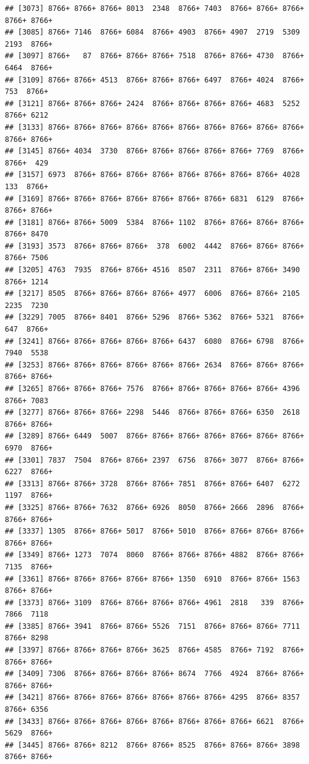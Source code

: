 \documentclass[
]{book}
\begin{document}
\begin{verbatim}
## [3073] 8766+ 8766+ 8766+ 8013  2348  8766+ 7403  8766+ 8766+ 8766+ 8766+ 8766+
## [3085] 8766+ 7146  8766+ 6084  8766+ 4903  8766+ 4907  2719  5309  2193  8766+
## [3097] 8766+   87  8766+ 8766+ 8766+ 7518  8766+ 8766+ 4730  8766+ 6464  8766+
## [3109] 8766+ 8766+ 4513  8766+ 8766+ 8766+ 6497  8766+ 4024  8766+  753  8766+
## [3121] 8766+ 8766+ 8766+ 2424  8766+ 8766+ 8766+ 8766+ 4683  5252  8766+ 6212 
## [3133] 8766+ 8766+ 8766+ 8766+ 8766+ 8766+ 8766+ 8766+ 8766+ 8766+ 8766+ 8766+
## [3145] 8766+ 4034  3730  8766+ 8766+ 8766+ 8766+ 8766+ 7769  8766+ 8766+  429 
## [3157] 6973  8766+ 8766+ 8766+ 8766+ 8766+ 8766+ 8766+ 8766+ 4028   133  8766+
## [3169] 8766+ 8766+ 8766+ 8766+ 8766+ 8766+ 8766+ 6831  6129  8766+ 8766+ 8766+
## [3181] 8766+ 8766+ 5009  5384  8766+ 1102  8766+ 8766+ 8766+ 8766+ 8766+ 8470 
## [3193] 3573  8766+ 8766+ 8766+  378  6002  4442  8766+ 8766+ 8766+ 8766+ 7506 
## [3205] 4763  7935  8766+ 8766+ 4516  8507  2311  8766+ 8766+ 3490  8766+ 1214 
## [3217] 8505  8766+ 8766+ 8766+ 8766+ 4977  6006  8766+ 8766+ 2105  2235  7230 
## [3229] 7005  8766+ 8401  8766+ 5296  8766+ 5362  8766+ 5321  8766+  647  8766+
## [3241] 8766+ 8766+ 8766+ 8766+ 8766+ 6437  6080  8766+ 6798  8766+ 7940  5538 
## [3253] 8766+ 8766+ 8766+ 8766+ 8766+ 8766+ 2634  8766+ 8766+ 8766+ 8766+ 8766+
## [3265] 8766+ 8766+ 8766+ 7576  8766+ 8766+ 8766+ 8766+ 8766+ 4396  8766+ 7083 
## [3277] 8766+ 8766+ 8766+ 2298  5446  8766+ 8766+ 8766+ 6350  2618  8766+ 8766+
## [3289] 8766+ 6449  5007  8766+ 8766+ 8766+ 8766+ 8766+ 8766+ 8766+ 6970  8766+
## [3301] 7837  7504  8766+ 8766+ 2397  6756  8766+ 3077  8766+ 8766+ 6227  8766+
## [3313] 8766+ 8766+ 3728  8766+ 8766+ 7851  8766+ 8766+ 6407  6272  1197  8766+
## [3325] 8766+ 8766+ 7632  8766+ 6926  8050  8766+ 2666  2896  8766+ 8766+ 8766+
## [3337] 1305  8766+ 8766+ 5017  8766+ 5010  8766+ 8766+ 8766+ 8766+ 8766+ 8766+
## [3349] 8766+ 1273  7074  8060  8766+ 8766+ 8766+ 4882  8766+ 8766+ 7135  8766+
## [3361] 8766+ 8766+ 8766+ 8766+ 8766+ 1350  6910  8766+ 8766+ 1563  8766+ 8766+
## [3373] 8766+ 3109  8766+ 8766+ 8766+ 8766+ 4961  2818   339  8766+ 7866  7118 
## [3385] 8766+ 3941  8766+ 8766+ 5526  7151  8766+ 8766+ 8766+ 7711  8766+ 8298 
## [3397] 8766+ 8766+ 8766+ 8766+ 3625  8766+ 4585  8766+ 7192  8766+ 8766+ 8766+
## [3409] 7306  8766+ 8766+ 8766+ 8766+ 8674  7766  4924  8766+ 8766+ 8766+ 8766+
## [3421] 8766+ 8766+ 8766+ 8766+ 8766+ 8766+ 8766+ 4295  8766+ 8357  8766+ 6356 
## [3433] 8766+ 8766+ 8766+ 8766+ 8766+ 8766+ 8766+ 8766+ 6621  8766+ 5629  8766+
## [3445] 8766+ 8766+ 8212  8766+ 8766+ 8525  8766+ 8766+ 8766+ 3898  8766+ 8766+

\end{verbatim}
\end{document}

